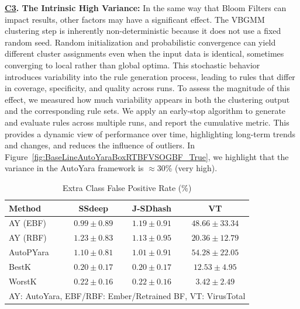 \noindent\textbf{\underline{C3}. The Intrinsic High Variance:} In the same way that Bloom Filters can impact results, other factors may have a significant effect. The VBGMM clustering step is inherently non-deterministic because it does not use a fixed random seed. Random initialization and probabilistic convergence can yield different cluster assignments even when the input data is identical, sometimes converging to local rather than global optima. This stochastic behavior introduces variability into the rule generation process, leading to rules that differ in coverage, specificity, and quality across runs. To assess the magnitude of this effect, we measured how much variability appears in both the clustering output and the corresponding rule sets. We apply an early-stop algorithm to generate and evaluate rules across multiple runs, and report the cumulative metric. This provides a dynamic view of performance over time, highlighting long-term trends and changes, and reduces the influence of outliers. In Figure~\ref{fig:BaseLineAutoYaraBoxRTBFVSOGBF_True}, we highlight that the variance in the AutoYara framework is $\approx$30\% (very high).  




\begin{table}[H]
\vspace{-3mm}

\centering
\scriptsize
\setlength{\tabcolsep}{3pt}

\caption{Extra Class False Positive Rate (\%)}
\label{tab:Merged-False-Positives}
\vspace{-2mm}

\begin{tabular}{lccc}
\toprule
\textbf{Method} & \textbf{SSdeep} & \textbf{J-SDhash} & \textbf{VT} \\
\midrule
AY (EBF)   & $0.99 \pm 0.89$ & $1.19 \pm 0.91$ & $48.66 \pm 33.34$ \\
AY (RBF)   & $1.23 \pm 0.83$ & $1.13 \pm 0.95$ & $20.36 \pm 12.79$ \\
AutoPYara  & $1.10 \pm 0.81$ & $1.01 \pm 0.91$ & $54.28 \pm 22.05$ \\
BestK      & $0.20 \pm 0.17$ & $0.20 \pm 0.17$ & $12.53 \pm 4.95$ \\
WorstK     & $0.22 \pm 0.16$ & $0.22 \pm 0.16$ & $3.42 \pm 2.49$ \\
\midrule
\multicolumn{4}{l}{\scriptsize AY: AutoYara, EBF/RBF: Ember/Retrained BF, VT: VirusTotal}
\end{tabular}
\vspace{-2mm}
\end{table}


